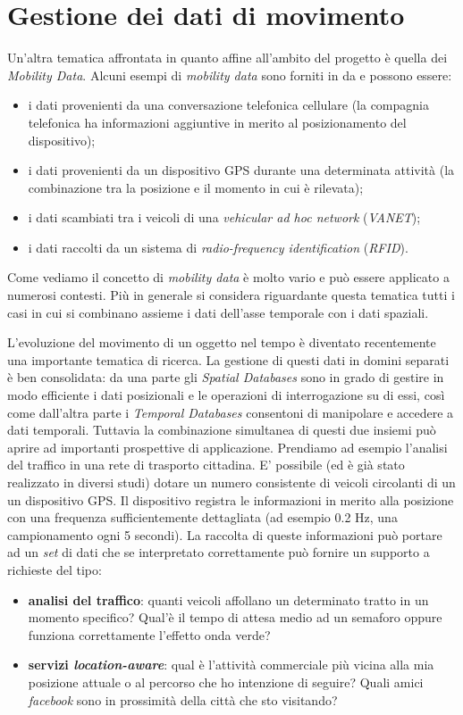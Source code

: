 \section{Gestione dei dati di movimento}
Un'altra tematica affrontata in quanto affine all'ambito del progetto è quella dei \emph{Mobility Data}. Alcuni esempi di \emph{mobility data} sono forniti in \cite{mdme} da \citeauthor{mdme} e possono essere:
\begin{itemize}
  \item i dati provenienti da una conversazione telefonica cellulare (la compagnia telefonica ha informazioni aggiuntive in merito al posizionamento del dispositivo);
  \item i dati provenienti da un dispositivo GPS durante una determinata attività (la combinazione tra la posizione e il momento in cui è rilevata);
  \item i dati scambiati tra i veicoli di una \emph{vehicular ad hoc network} (\emph{VANET});
  \item i dati raccolti da un sistema di \emph{radio-frequency identification} (\emph{RFID}).
\end{itemize}
Come vediamo il concetto di \emph{mobility data} è molto vario e può essere applicato a numerosi contesti. Più in generale si considera riguardante questa tematica tutti i casi in cui si combinano assieme i dati dell'asse temporale con i dati spaziali. 

L'evoluzione del movimento di un oggetto nel tempo è diventato recentemente una importante tematica di ricerca. La gestione di questi dati in domini separati è ben consolidata: da una parte gli \emph{Spatial Databases} sono in grado di gestire in modo efficiente i dati posizionali e le operazioni di interrogazione su di essi, così come dall'altra parte i \emph{Temporal Databases} consentoni di manipolare e accedere a dati temporali. Tuttavia la combinazione simultanea di questi due insiemi può aprire ad importanti prospettive di applicazione. Prendiamo ad esempio l'analisi del traffico in una rete di trasporto cittadina. E' possibile (ed è già stato realizzato in diversi studi) dotare un numero consistente di veicoli circolanti di un un dispositivo GPS. Il dispositivo registra le informazioni in merito alla posizione con una frequenza sufficientemente dettagliata (ad esempio 0.2 Hz, una campionamento ogni 5 secondi). La raccolta di queste informazioni può portare ad un \emph{set} di dati che se interpretato correttamente può fornire un supporto a richieste del tipo:
\begin{itemize}
  \item \textbf{analisi del traffico}: quanti veicoli affollano un determinato tratto in un momento specifico? Qual'è il tempo di attesa medio ad un semaforo oppure funziona correttamente l'effetto onda verde?
  \item \textbf{servizi \emph{location-aware}}: qual è l'attività commerciale più vicina alla mia posizione attuale o al percorso che ho intenzione di seguire? Quali amici \emph{facebook} sono in prossimità della città che sto visitando?
\end{itemize}

